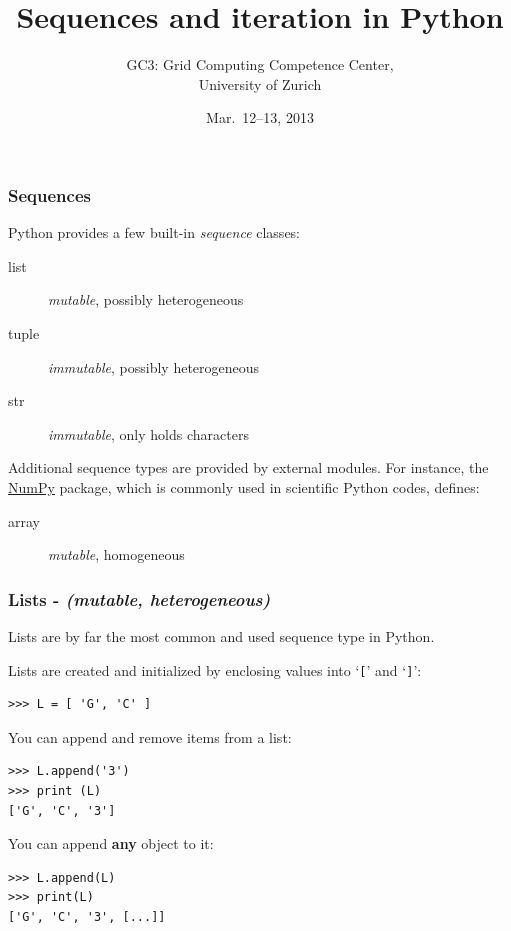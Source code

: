 \documentclass[english,serif,mathserif,xcolor=pdftex,dvipsnames,table]{beamer}
\title[Sequences, Iteration]{%
  Sequences and iteration in Python
}
\author[GC3]{%
  GC3: Grid Computing Competence Center, \\
  University of Zurich
}
\date{Mar.~12--13, 2013}
\begin{document}
\maketitle


\begin{frame}
  \frametitle{Sequences}

  Python provides a few built-in \emph{sequence} classes:
  \begin{description}
  \item[list] \emph{mutable}, possibly heterogeneous
  \item[tuple] \emph{immutable}, possibly heterogeneous
  \item[str] \emph{immutable}, only holds characters
  \end{description}
  Additional sequence types are provided by external modules. For
  instance,  the
  \href{http://numpy.scipy.org}{NumPy} package, which is commonly used in
  scientific Python codes, defines:
  \begin{description}
  \item[array] \emph{mutable}, homogeneous
  \end{description}

\end{frame}




\begin{frame}[fragile]
  \frametitle{Lists - \textit{(mutable, heterogeneous)}}
  Lists are by far the most common and used sequence type in Python.

  \+
  Lists are created and initialized by enclosing values into
  `\texttt{[}' and `\texttt{]}':
\begin{lstlisting}
>>> L = [ 'G', 'C' ]
\end{lstlisting}

  \+
  You can append and remove items from a list:
\begin{lstlisting}
>>> L.append('3')
>>> print (L)
['G', 'C', '3']
\end{lstlisting}

  \+
  You can append \textbf{any} object to it:
\begin{lstlisting}
>>> L.append(L)
>>> print(L)
['G', 'C', '3', [...]]
\end{lstlisting}

\end{frame}
\end{document}
